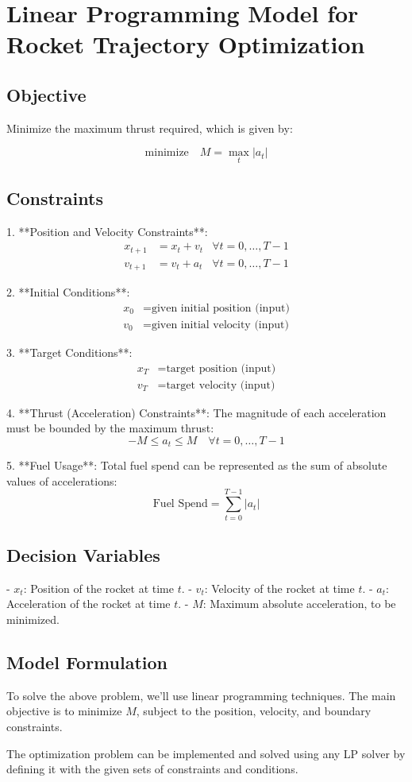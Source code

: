 \documentclass{article}
\begin{document}
\section*{Linear Programming Model for Rocket Trajectory Optimization}

\subsection*{Objective}
Minimize the maximum thrust required, which is given by:

\[
\text{minimize} \quad M = \max_{t} |a_t|
\]

\subsection*{Constraints}

1. **Position and Velocity Constraints**:
   \begin{align*}
   x_{t+1} &= x_t + v_t & \forall t = 0, \ldots, T-1 \\
   v_{t+1} &= v_t + a_t & \forall t = 0, \ldots, T-1
   \end{align*}

2. **Initial Conditions**:
   \begin{align*}
   x_0 &= \text{given initial position (input)} \\
   v_0 &= \text{given initial velocity (input)}
   \end{align*}

3. **Target Conditions**:
   \begin{align*}
   x_T &= \text{target position (input)} \\
   v_T &= \text{target velocity (input)}
   \end{align*}

4. **Thrust (Acceleration) Constraints**:
   The magnitude of each acceleration must be bounded by the maximum thrust:
   \[
   -M \leq a_t \leq M \quad \forall t = 0, \ldots, T-1
   \]

5. **Fuel Usage**:
   Total fuel spend can be represented as the sum of absolute values of accelerations:
   \[
   \text{Fuel Spend} = \sum_{t=0}^{T-1} |a_t|
   \]

\subsection*{Decision Variables}

- \(x_t\): Position of the rocket at time \(t\).
- \(v_t\): Velocity of the rocket at time \(t\).
- \(a_t\): Acceleration of the rocket at time \(t\).
- \(M\): Maximum absolute acceleration, to be minimized.

\subsection*{Model Formulation}

To solve the above problem, we'll use linear programming techniques. The main objective is to minimize \(M\), subject to the position, velocity, and boundary constraints. 

The optimization problem can be implemented and solved using any LP solver by defining it with the given sets of constraints and conditions.
\end{document}
